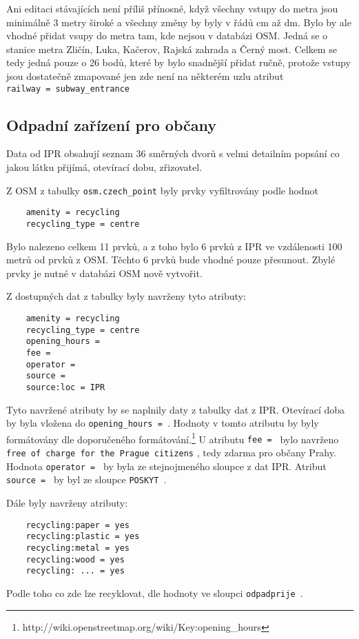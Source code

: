 Ani editaci stávajících není příliš přínosné, když všechny vstupy do metra jsou
minimálně 3 metry široké a všechny změny by byly v řádů cm až dm. 
Bylo by ale vhodné přidat vsupy do metra tam, kde nejsou v databázi OSM.
Jedná se o stanice metra Zličín, Luka, Kačerov, Rajská zahrada a Černý most. 
Celkem se tedy jedná pouze o 26 bodů, které by bylo snadnější přidat ručně, 
protože vstupy jsou dostatečně zmapované jen zde není na některém uzlu atribut {\tt railway~=~subway\_entrance}


\subsection{Odpadní zařízení pro občany}
\label{Odpadní zařízení pro občany}
Data od IPR obsahují seznam 36 směrných dvorů s velmi detailním popsání co 
jakou látku přijímá, otevírací dobu, zřizovatel. 

Z OSM z tabulky {\tt osm.czech\_point} byly prvky vyfiltrovány podle hodnot 
\begin{verbatim}
    amenity = recycling
    recycling_type = centre
\end{verbatim}    
Bylo nalezeno celkem 11 prvků, a z toho bylo 6 prvků z IPR ve vzdálenosti 
100 metrů od prvků z OSM. Těchto 6 prvků bude vhodné pouze přesunout. Zbylé 
prvky je nutné v databázi OSM nově vytvořit.

Z dostupných dat z tabulky byly navrženy tyto atributy: 
\begin{verbatim}
    amenity = recycling
    recycling_type = centre
    opening_hours =
    fee =
    operator = 
    source = 
    source:loc = IPR
\end{verbatim}
Tyto navržené atributy by se naplnily daty z tabulky dat z IPR.
Otevírací doba by byla vložena do {\tt opening\_hours~= }.
Hodnoty v tomto atributu by byly formátovány dle doporučeného formátování.\footnote{http://wiki.openstreetmap.org/wiki/Key:opening\_hours}
 U atributu {\tt fee~= }
bylo navrženo {\tt free of charge for the Prague citizens} , tedy zdarma pro občany Prahy.
Hodnota {\tt operator~= } by byla ze stejnojmeného sloupce z dat IPR.
Atribut {\tt source~= } by byl ze sloupce {\tt POSKYT }.

Dále byly navrženy atributy:
\begin{verbatim}
    recycling:paper = yes
    recycling:plastic = yes
    recycling:metal = yes
    recycling:wood = yes
    recycling: ... = yes
\end{verbatim}
Podle toho co zde lze recyklovat, dle hodnoty ve sloupci {\tt odpadprije }.


